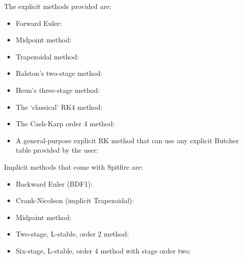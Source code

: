 \documentclass[letterpaper,10pt,english]{sphinxmanual}
\begin{document}
The explicit methods provided are:
\begin{itemize}
\item {} 
Forward Euler: 

\item {} 
Midpoint method: 

\item {} 
Trapezoidal method: 

\item {} 
Ralston’s two-stage method: 

\item {} 
Heun’s three-stage method: 

\item {} 
The ‘classical’ RK4 method: 

\item {} 
The Cash-Karp order 4 method: 

\item {} 
A general-purpose explicit RK method that can use any explicit Butcher table provided by the user: 

\end{itemize}

Implicit methods that come with Spitfire are:
\begin{itemize}
\item {} 
Backward Euler (BDF1): 

\item {} 
Crank-Nicolson (implicit Trapezoidal): 

\item {} 
Midpoint method: 

\item {} 
Two-stage, L-stable, order 2 method: 

\item {} 
Six-stage, L-stable, order 4 method with stage order two: 

\end{itemize}
\end{document}
